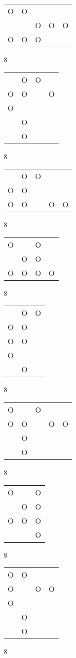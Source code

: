 \begin{tabular}{|m{0.2cm}m{0.2cm}m{0.2cm}m{0.2cm}m{0.2cm}|}\hline
O&O& & & \\
 & &O&O&O\\
O&O&O& & \\
\hline\end{tabular}8
\begin{tabular}{|m{0.2cm}m{0.2cm}m{0.2cm}m{0.2cm}|}\hline
 &O&O& \\
O&O& &O\\
O& & & \\
 &O& & \\
 &O& & \\
\hline\end{tabular}8
\begin{tabular}{|m{0.2cm}m{0.2cm}m{0.2cm}m{0.2cm}m{0.2cm}|}\hline
 &O&O& & \\
O&O& & & \\
O&O& &O&O\\
\hline\end{tabular}8
\begin{tabular}{|m{0.2cm}m{0.2cm}m{0.2cm}m{0.2cm}|}\hline
O& &O& \\
 &O&O& \\
O&O&O&O\\
\hline\end{tabular}8
\begin{tabular}{|m{0.2cm}m{0.2cm}m{0.2cm}|}\hline
 &O&O\\
O&O& \\
O&O& \\
O& & \\
 &O& \\
\hline\end{tabular}8
\begin{tabular}{|m{0.2cm}m{0.2cm}m{0.2cm}m{0.2cm}m{0.2cm}|}\hline
O& &O& & \\
O&O& &O&O\\
 &O& & & \\
 &O& & & \\
\hline\end{tabular}8
\begin{tabular}{|m{0.2cm}m{0.2cm}m{0.2cm}|}\hline
O& &O\\
 &O&O\\
O&O&O\\
 & &O\\
\hline\end{tabular}8
\begin{tabular}{|m{0.2cm}m{0.2cm}m{0.2cm}m{0.2cm}|}\hline
O&O& & \\
O& &O&O\\
O& & & \\
 &O& & \\
 &O& & \\
\hline\end{tabular}8
